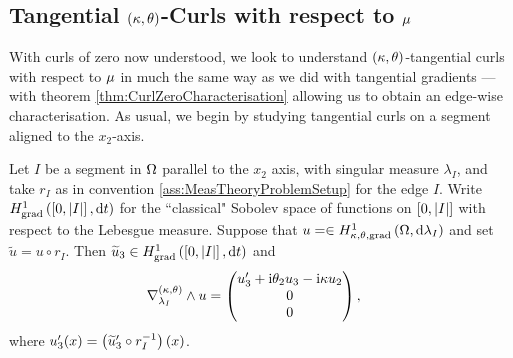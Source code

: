 \subsection{Tangential $\left( \kappa, \theta \right)$-Curls with respect to $\mu$} \label{apps:TangentialCurls}
With curls of zero now understood, we look to understand $\left( \kappa, \theta \right)$-tangential curls with respect to $\mu$ in much the same way as we did with tangential gradients --- with theorem \ref{thm:CurlZeroCharacterisation} allowing us to obtain an edge-wise characterisation.
As usual, we begin by studying tangential curls on a segment aligned to the $x_2$-axis.

\begin{prop} \label{prop:TangCurlsSegment}
	Let $I$ be a segment in $\Omega$ parallel to the $x_2$ axis, with singular measure $\lambda_I$, and take $r_I$ as in convention \ref{ass:MeasTheoryProblemSetup} for the edge $I$.
	Write $H^1_\mathrm{grad}\left( \left[ 0,\left\lvert I \right\rvert \right], \mathrm{d}t \right)$ for the ``classical" Sobolev space of functions on $\left[ 0,\left\lvert I \right\rvert \right]$ with respect to the Lebesgue measure.
	Suppose that $u=\in H^1_{\kappa,\theta,\mathrm{grad}}\left( \Omega, \mathrm{d}\lambda_I \right)$ and set $\widetilde{u} = u \circ r_I$.
	Then $\widetilde{u}_3\in H^1_\mathrm{grad}\left( \left[ 0,\left\lvert I \right\rvert \right], \mathrm{d}t \right)$ and
	\begin{align*}
		\nabla_{\lambda_I}^{\left( \kappa, \theta \right)}\wedge u &= 
		\begin{pmatrix} u_3' + \mathrm{i}\theta_2 u_3 - \mathrm{i}\kappa u_2 \\ 0 \\ 0 \end{pmatrix},
	\end{align*}
	where $u_3'(x) = \left( \widetilde{u}'_3\circ r_I^{-1} \right)(x)$.
\end{prop}
